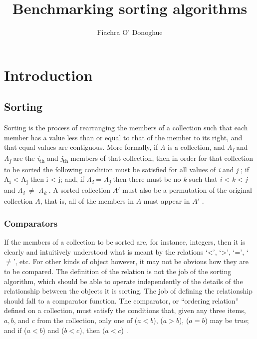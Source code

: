 \documentclass[12pt, a4paper]{article}
\title{Benchmarking sorting algorithms}
\author{Fiachra O' Donoghue}
\begin{document}
\maketitle

\section{Introduction}

\subsection{Sorting}

Sorting is the process of rearranging the members of a collection such that each member has a value less than or equal to that of the member to its right, and that equal values are contiguous. More formally, if \emph{A} is a collection, and \emph{A\textsubscript{i}} and \emph{A\textsubscript{j}} are the \emph{i}\textsubscript{th}  and \emph{j}\textsubscript{th} members of that collection, then in order for that collection to be sorted the following condition must be satisfied for all values of \emph{i} and \emph{j}
; if A\textsubscript{i} < A\textsubscript{j} then i < j; and, if \emph{A\textsubscript{i}} = \emph{A\textsubscript{j}} then there must be no \emph{k} such that \emph{i} < \emph{k} < \emph{j} and \emph{A\textsubscript{i}} $\ne$ \emph{A\textsubscript{k}} \autocite[53]{heineman2016algorithms}. A sorted collection $A'$ must also be a permutation of the original collection $A$, that is, all of the members in $A$ must appear in $A'$ \autocite[15]{cormen01}.

\subsubsection{Comparators}

If the members of a collection to be sorted are, for instance, integers, then it is clearly and intuitively understood what is meant by the relations `<', `>', `=', `$\ne$', etc. For other kinds of object however, it may not be obvious how they are to be compared. The definition of the relation is not the job of the sorting algorithm, which should be able to operate independently of the details of the relationship between the objects it is sorting. The job of defining the relationship should fall to a comparator function. The comparator, or ``ordering relation'' defined on a collection, must satisfy the conditions that, given any three items, $a, b$, and $c$ from the collection, only one of ($a < b$), ($a > b$), ($a = b$) may be true; and if ($a < b$) and ($b < c$), then $(a < c$) \autocite[5]{knuth1968art}.
\end{document}
